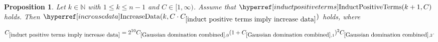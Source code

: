 \documentclass[12pt,reqno]{amsart}
\theoremstyle{plain}
\newtheorem{proposition}[theorem]{Proposition}
\numberwithin{equation}{section}
\theoremstyle{remark}
\newcommand{\uses}[1]{}
\newcommand{\usesdefs}[1]{}
\newcommand{\N}{{\mathbb N}}
\begin{document}
\begin{proposition}
\label{induct positive terms imply increase data}\uses{Gaussian domination combined,Monotonicity K}\usesdefs{multiplicatively spaced monotone sequences,geometric parameters,kernel sequences,sandwich kernel,s multiplier,L multiplier,N multiplier,induct positive terms,increase data}
Let $k\in\N$ with $1\le k\le n-1$ and $C\in [1,\infty)$.
Assume that $\InductPositiveTerms{k+1,C}$ holds. Then $\IncreaseData{k,C\cdot C_{\ref{induct positive terms imply increase data}}}$ holds, where
\begin{equation}\label{auto:increase-data-induction-constant-definition}C_{\ref{induct positive terms imply increase data}} = 2^{10} C_{\ref{Gaussian domination combined},0} (1+C_{\ref{Gaussian domination combined},1})^2 C_{\ref{Gaussian domination combined},2}.\end{equation}
\end{proposition}
\end{document}

